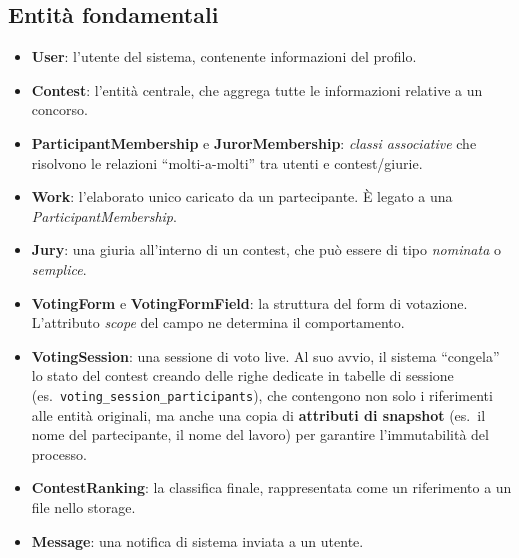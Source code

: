 \subsection{Entità fondamentali}\label{subsec:entita-fondamentali}
\begin{itemize}
    \item \textbf{User}: l'utente del sistema, contenente informazioni del profilo.
    \item \textbf{Contest}: l'entità centrale, che aggrega tutte le informazioni relative a un concorso.
    \item \textbf{ParticipantMembership} e \textbf{JurorMembership}: \emph{classi associative} che risolvono le relazioni ``molti-a-molti'' tra utenti e contest/giurie.
    \item \textbf{Work}: l'elaborato unico caricato da un partecipante.
    È legato a una \emph{ParticipantMembership}.
    \item \textbf{Jury}: una giuria all'interno di un contest, che può essere di tipo \emph{nominata} o \emph{semplice}.
    \item \textbf{VotingForm} e \textbf{VotingFormField}: la struttura del form di votazione.
    L'attributo \emph{scope} del campo ne determina il comportamento.
    \item \textbf{VotingSession}: una sessione di voto live.
    Al suo avvio, il sistema ``congela'' lo stato del contest creando delle righe dedicate in tabelle di sessione (es.\ \texttt{voting\_session\_participants}), che contengono non solo i riferimenti alle entità originali, ma anche una copia di \textbf{attributi di snapshot} (es.\ il nome del partecipante, il nome del lavoro) per garantire l'immutabilità del processo.
    \item \textbf{ContestRanking}: la classifica finale, rappresentata come un riferimento a un file nello storage.
    \item \textbf{Message}: una notifica di sistema inviata a un utente.
\end{itemize}

